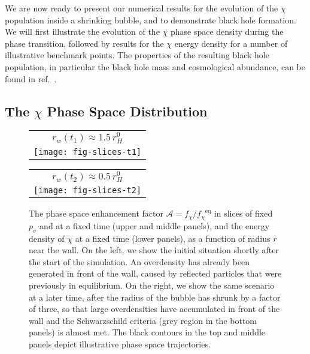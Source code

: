 \documentclass[
onecolumn, %
11pt, %
tightenlines,
superscriptaddress, %
nofootinbib, %
preprintnumbers, %
prd %
]{revtex4-1}
\newcommand{\f}{\ensuremath{f_\chi}\xspace}
\newcommand{\A}{\ensuremath{\mathcal A}\xspace}
\begin{document}
We are now ready to present our numerical results for the evolution of the $\chi$ population inside a shrinking bubble, and to demonstrate black hole formation. We will first illustrate the evolution of the $\chi$ phase space density during the phase transition, followed by results for the $\chi$ energy density for a number of illustrative benchmark points. The properties of the resulting black hole population, in particular the black hole mass and cosmological abundance, can be found in ref.~\cite{Baker:2021nyl}.


\subsection{The $\chi$ Phase Space Distribution}
\label{sec:phase-space-distribution-function}

\begin{figure}
    \centering
    \hspace*{\fill}
    \begin{tabular}{c}
        {\large $r_w(t_1) \approx 1.5\,r_H^0$}\\[0.3em]
        \texttt{[image: fig-slices-t1]}
    \end{tabular}
    \hfill
    \begin{tabular}{c}
        {\large $r_w(t_2) \approx 0.5\,r_H^0$}\\[0.3em]
        \texttt{[image: fig-slices-t2]}
    \end{tabular}
    \hspace*{\fill}
    \caption{The phase space enhancement factor $\A = \f / \f^\text{eq}$ in slices of fixed $p_\sigma$ and at a fixed time (upper and middle panels), and the energy density of $\chi$ at a fixed time (lower panels), as a function of radius $r$ near the wall. On the left, we show the initial situation shortly after the start of the simulation. An overdensity has already been generated in front of the wall, caused by reflected particles that were previously in equilibrium. On the right, we show the same scenario at a later time, after the radius of the bubble has shrunk by a factor of three, so that large overdensities have accumulated in front of the wall and the Schwarzschild criteria (grey region in the bottom panels) is almost met. The black contours in the top and middle panels depict illustrative phase space trajectories.}
    \label{fig:slices}
\end{figure}
\end{document}
